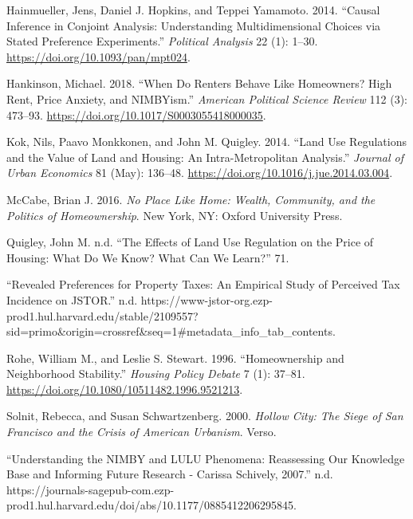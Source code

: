 \documentclass[]{article}
\begin{document}
\leavevmode\hypertarget{ref-hainmuellerCausalInferenceConjoint2014}{}%
Hainmueller, Jens, Daniel J. Hopkins, and Teppei Yamamoto. 2014. ``Causal Inference in Conjoint Analysis: Understanding Multidimensional Choices via Stated Preference Experiments.'' \emph{Political Analysis} 22 (1): 1--30. \url{https://doi.org/10.1093/pan/mpt024}.

\leavevmode\hypertarget{ref-hankinsonWhenRentersBehave2018}{}%
Hankinson, Michael. 2018. ``When Do Renters Behave Like Homeowners? High Rent, Price Anxiety, and NIMBYism.'' \emph{American Political Science Review} 112 (3): 473--93. \url{https://doi.org/10.1017/S0003055418000035}.

\leavevmode\hypertarget{ref-kokLandUseRegulations2014}{}%
Kok, Nils, Paavo Monkkonen, and John M. Quigley. 2014. ``Land Use Regulations and the Value of Land and Housing: An Intra-Metropolitan Analysis.'' \emph{Journal of Urban Economics} 81 (May): 136--48. \url{https://doi.org/10.1016/j.jue.2014.03.004}.

\leavevmode\hypertarget{ref-mccabeNoPlaceHome2016}{}%
McCabe, Brian J. 2016. \emph{No Place Like Home: Wealth, Community, and the Politics of Homeownership}. New York, NY: Oxford University Press.

\leavevmode\hypertarget{ref-quigleyEffectsLandUse}{}%
Quigley, John M. n.d. ``The Effects of Land Use Regulation on the Price of Housing: What Do We Know? What Can We Learn?'' 71.

\leavevmode\hypertarget{ref-RevealedPreferencesProperty}{}%
``Revealed Preferences for Property Taxes: An Empirical Study of Perceived Tax Incidence on JSTOR.'' n.d. https://www-jstor-org.ezp-prod1.hul.harvard.edu/stable/2109557?sid=primo\&origin=crossref\&seq=1\#metadata\_info\_tab\_contents.

\leavevmode\hypertarget{ref-roheHomeownershipNeighborhoodStability1996}{}%
Rohe, William M., and Leslie S. Stewart. 1996. ``Homeownership and Neighborhood Stability.'' \emph{Housing Policy Debate} 7 (1): 37--81. \url{https://doi.org/10.1080/10511482.1996.9521213}.

\leavevmode\hypertarget{ref-solnitHollowCitySiege2000}{}%
Solnit, Rebecca, and Susan Schwartzenberg. 2000. \emph{Hollow City: The Siege of San Francisco and the Crisis of American Urbanism}. Verso.

\leavevmode\hypertarget{ref-UnderstandingNIMBYLULU}{}%
``Understanding the NIMBY and LULU Phenomena: Reassessing Our Knowledge Base and Informing Future Research - Carissa Schively, 2007.'' n.d. https://journals-sagepub-com.ezp-prod1.hul.harvard.edu/doi/abs/10.1177/0885412206295845.
\end{document}
